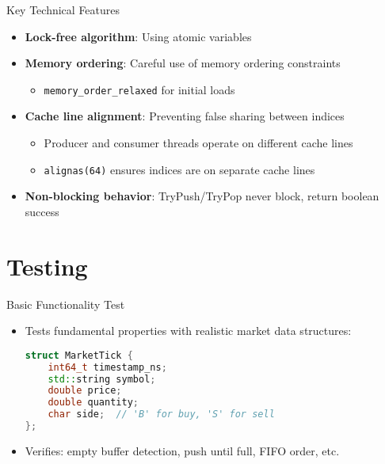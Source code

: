 \documentclass{beamer}
\begin{document}
\begin{frame}{Key Technical Features}
\begin{itemize}
    \item \textbf{Lock-free algorithm}: Using atomic variables
    \item \textbf{Memory ordering}: Careful use of memory ordering constraints
    \begin{itemize}
        \item \texttt{memory\_order\_relaxed} for initial loads
    \end{itemize}
    \item \textbf{Cache line alignment}: Preventing false sharing between indices
    \begin{itemize}
        \item Producer and consumer threads operate on different cache lines
        \item \texttt{alignas(64)} ensures indices are on separate cache lines
    \end{itemize}
    \item \textbf{Non-blocking behavior}: TryPush/TryPop never block, return boolean success
\end{itemize}
\end{frame}

\section{Testing}

\begin{frame}[fragile]{Basic Functionality Test}
\begin{itemize}
    \item Tests fundamental properties with realistic market data structures:
\begin{lstlisting}[language=C++]
struct MarketTick {
    int64_t timestamp_ns;
    std::string symbol;
    double price;
    double quantity;
    char side;  // 'B' for buy, 'S' for sell
};
\end{lstlisting}
    \item Verifies: empty buffer detection, push until full, FIFO order, etc.
\end{itemize}
\end{frame}
\end{document}
